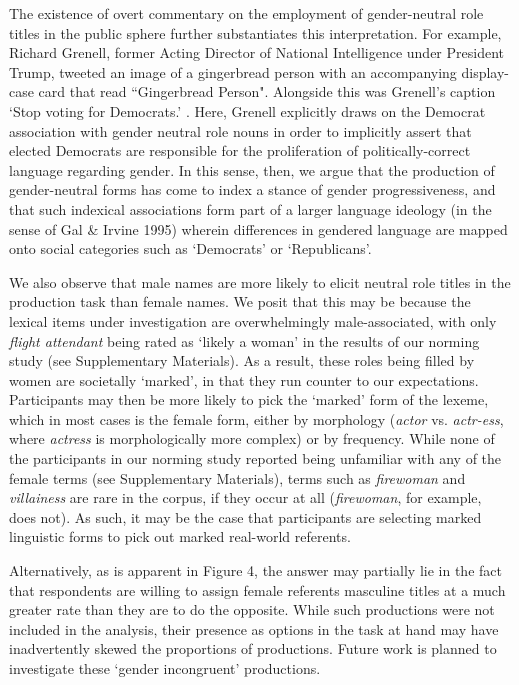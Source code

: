\documentclass[10pt,letterpaper]{article}
\begin{document}
	The existence of overt commentary on the employment of gender-neutral role titles in the public sphere further substantiates this interpretation. For example, Richard Grenell, former Acting Director of National Intelligence under President Trump, tweeted an image of a gingerbread person with an accompanying display-case card that read ``Gingerbread Person". Alongside this was Grenell's caption `Stop voting for Democrats.' \parencite{Grenell}. Here, Grenell explicitly draws on the Democrat association with gender neutral role nouns in order to implicitly assert that elected Democrats are responsible for the proliferation of politically-correct language regarding gender. In this sense, then, we argue that the production of gender-neutral forms has come to index a stance of gender progressiveness, and that such indexical associations form part of a larger language ideology (in the sense of Gal \& Irvine 1995) wherein differences in gendered language are mapped onto social categories such as `Democrats' or `Republicans'.\par 
	We also observe that male names are more likely to elicit neutral role titles in the production task than female names. We posit that this may be because the lexical items under investigation are overwhelmingly male-associated, with only \textit{flight attendant} being rated as `likely a woman' in the results of our norming study (see Supplementary Materials). As a result, these roles being filled by women are societally `marked', in that they run counter to our expectations. Participants may then be more likely to pick the `marked' form of the lexeme, which in most cases is the female form, either by morphology (\textit{actor} vs. \textit{actr-ess}, where \textit{actress} is morphologically more complex) or by frequency. While none of the participants in our norming study reported being unfamiliar with any of the female terms (see Supplementary Materials), terms such as \textit{firewoman} and \textit{villainess} are rare in the corpus, if they occur at all (\textit{firewoman}, for example, does not). As such, it may be the case that participants are selecting marked linguistic forms to pick out marked real-world referents.\par 
	Alternatively, as is apparent in Figure 4, the answer may partially lie in the fact that respondents are willing to assign female referents masculine titles at a much greater rate than they are to do the opposite. While such productions were not included in the analysis, their presence as options in the task at hand may have inadvertently skewed the proportions of productions. Future work is planned to investigate these `gender incongruent' productions.\par 
\end{document}
